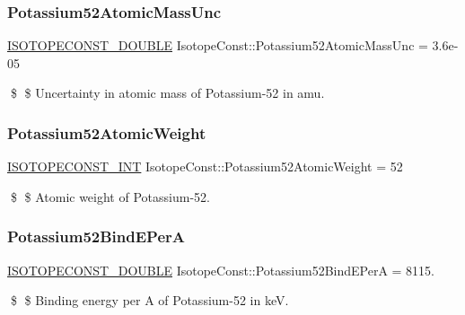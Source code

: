 \subsubsection{\texorpdfstring{Potassium52\+Atomic\+Mass\+Unc}{Potassium52AtomicMassUnc}}
{\footnotesize\ttfamily \mbox{\hyperlink{group___isotope_const-_macros_ga8f45a7272ce02c0b4c65c44636ed719a}{I\+S\+O\+T\+O\+P\+E\+C\+O\+N\+S\+T\+\_\+\+D\+O\+U\+B\+LE}} Isotope\+Const\+::\+Potassium52\+Atomic\+Mass\+Unc = 3.\+6e-\/05}

\$ \$ Uncertainty in atomic mass of Potassium-\/52 in amu. \mbox{\label{group___isotope_const-_potassium-_k52_ga100965ef3c99b89f36319d8dd7f45309}} 
\subsubsection{\texorpdfstring{Potassium52\+Atomic\+Weight}{Potassium52AtomicWeight}}
{\footnotesize\ttfamily \mbox{\hyperlink{group___isotope_const-_macros_ga5f18360b3e99483a35c32d789e62621c}{I\+S\+O\+T\+O\+P\+E\+C\+O\+N\+S\+T\+\_\+\+I\+NT}} Isotope\+Const\+::\+Potassium52\+Atomic\+Weight = 52}

\$ \$ Atomic weight of Potassium-\/52. \mbox{\label{group___isotope_const-_potassium-_k52_ga0e03eeb6932ecc27255fa29a30b8816c}} 
\subsubsection{\texorpdfstring{Potassium52\+Bind\+E\+PerA}{Potassium52BindEPerA}}
{\footnotesize\ttfamily \mbox{\hyperlink{group___isotope_const-_macros_ga8f45a7272ce02c0b4c65c44636ed719a}{I\+S\+O\+T\+O\+P\+E\+C\+O\+N\+S\+T\+\_\+\+D\+O\+U\+B\+LE}} Isotope\+Const\+::\+Potassium52\+Bind\+E\+PerA = 8115.}

\$ \$ Binding energy per A of Potassium-\/52 in keV. \mbox{\label{group___isotope_const-_potassium-_k52_ga114e2c2280daebfb4c2b7146d508481b}} 
